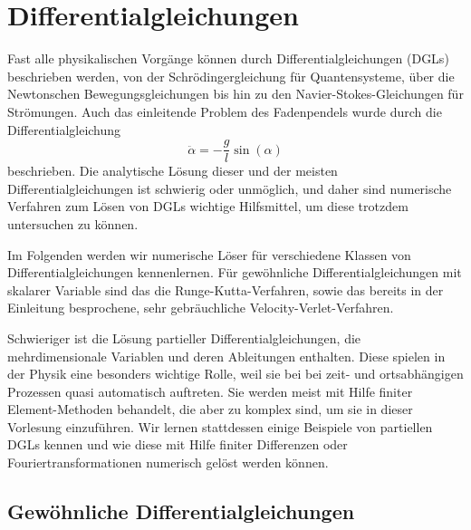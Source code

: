 % 

\chapter{Differentialgleichungen}

Fast alle physikalischen Vorgänge können durch Differentialgleichungen
(DGLs) beschrieben werden, von der Schrödingergleichung für
Quantensysteme, über die Newtonschen Bewegungsgleichungen bis hin zu
den Navier-Stokes-Gleichungen für Strömungen. Auch das einleitende
Problem des Fadenpendels wurde durch die Differentialgleichung
\begin{equation}
  \ddot\alpha = -\frac{g}{l}\sin(\alpha)
\end{equation}
beschrieben. Die analytische Lösung dieser und der meisten
Differentialgleichungen ist schwierig oder unmöglich, und daher sind
numerische Verfahren zum Lösen von DGLs wichtige Hilfsmittel, um diese
trotzdem untersuchen zu können.

Im Folgenden werden wir numerische Löser für verschiedene Klassen von
Differentialgleichungen kennenlernen. Für gewöhnliche
Differentialgleichungen mit skalarer Variable sind das die
Runge-Kutta-Verfahren, sowie das bereits in der Einleitung
besprochene, sehr gebräuchliche Velocity-Verlet-Verfahren.

Schwieriger ist die Lösung partieller Differentialgleichungen, die
mehrdimensionale Variablen und deren Ableitungen enthalten.  Diese
spielen in der Physik eine besonders wichtige Rolle, weil sie bei bei
zeit- und ortsabhängigen Prozessen quasi automatisch auftreten. Sie
werden meist mit Hilfe finiter Element-Methoden behandelt, die aber zu
komplex sind, um sie in dieser Vorlesung einzuführen. Wir lernen
stattdessen einige Beispiele von partiellen DGLs kennen und wie diese
mit Hilfe finiter Differenzen oder Fouriertransformationen numerisch
gelöst werden können.

\section{Gewöhnliche Differentialgleichungen}

